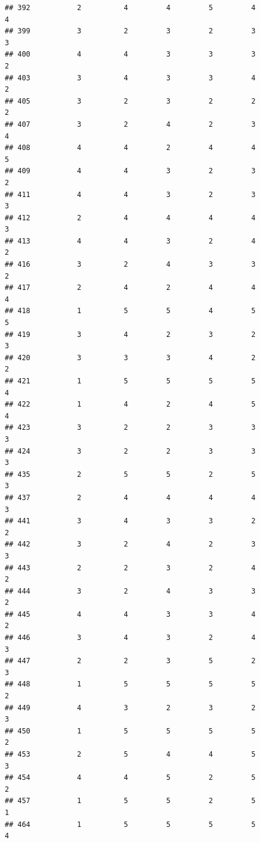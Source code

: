 \documentclass[
]{article}
\begin{document}
\begin{verbatim}
## 392           2          4         4         5         4             4
## 399           3          2         3         2         3             3
## 400           4          4         3         3         3             2
## 403           3          4         3         3         4             2
## 405           3          2         3         2         2             2
## 407           3          2         4         2         3             4
## 408           4          4         2         4         4             5
## 409           4          4         3         2         3             2
## 411           4          4         3         2         3             3
## 412           2          4         4         4         4             3
## 413           4          4         3         2         4             2
## 416           3          2         4         3         3             2
## 417           2          4         2         4         4             4
## 418           1          5         5         4         5             5
## 419           3          4         2         3         2             3
## 420           3          3         3         4         2             2
## 421           1          5         5         5         5             4
## 422           1          4         2         4         5             4
## 423           3          2         2         3         3             3
## 424           3          2         2         3         3             3
## 435           2          5         5         2         5             3
## 437           2          4         4         4         4             3
## 441           3          4         3         3         2             2
## 442           3          2         4         2         3             3
## 443           2          2         3         2         4             2
## 444           3          2         4         3         3             2
## 445           4          4         3         3         4             2
## 446           3          4         3         2         4             3
## 447           2          2         3         5         2             3
## 448           1          5         5         5         5             2
## 449           4          3         2         3         2             3
## 450           1          5         5         5         5             2
## 453           2          5         4         4         5             3
## 454           4          4         5         2         5             2
## 457           1          5         5         2         5             1
## 464           1          5         5         5         5             4

\end{verbatim}
\end{document}
